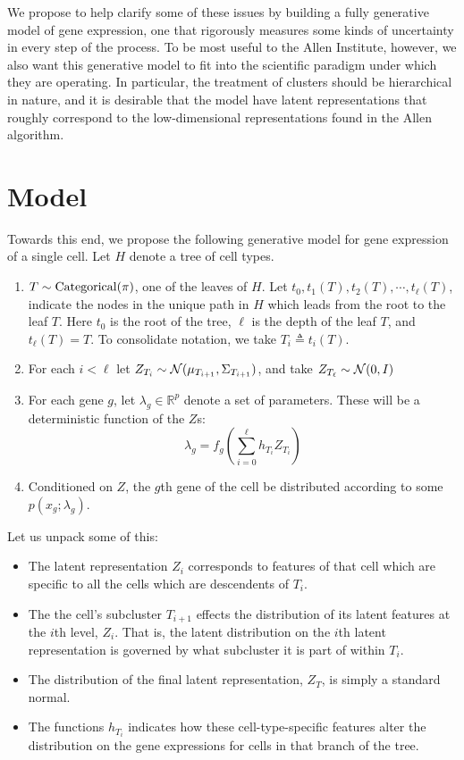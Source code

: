 We propose to help clarify some of these issues by building a fully generative model of gene expression, one that rigorously measures some kinds of uncertainty in every step of the process.  To be most useful to the Allen Institute, however, we also want this generative model to fit into the scientific paradigm under which they are operating.  In particular, the treatment of clusters should be hierarchical in nature, and it is desirable that the model have latent representations that roughly correspond to the low-dimensional representations found in the Allen algorithm.  

\section{Model}

Towards this end, we propose the following generative model for gene expression of a single cell.  Let $H$ denote a tree of cell types.   

\begin{enumerate}
\item $T \sim \operatorname*{Categorical}(\pi)$, one of the leaves of $H$.  Let $t_0,t_1(T),t_2(T),\cdots ,t_\ell(T)$, indicate the nodes in the unique path in $H$ which leads from the root to the leaf $T$.  Here $t_0$ is the root of the tree, $\ell$ is the depth of the leaf $T$, and $t_\ell(T)=T$.   To consolidate notation, we take $T_i \triangleq t_i(T)$.
\item For each $i<\ell$ let $Z_{T_i} \sim \mathcal{N}(\mu_{T_{i+1}},\Sigma_{T_{i+1}})$, and take $Z_{T_\ell} \sim \mathcal{N}(0,I)$
\item For each gene $g$, let $\lambda_g \in \mathbb R^{p}$ denote a set of parameters.  These will be a deterministic function of the $Z$s:
\[
\lambda_g = f_g \left(\sum_{i=0}^{\ell} h_{T_i}Z_{T_i}\right)
\]
\item Conditioned on $Z$, the  $g$th gene of the cell be distributed according to some $p(x_g ; \lambda_g)$. 
\end{enumerate}

Let us unpack some of this:

\begin{itemize}
\item The latent representation $Z_i$ corresponds to features of that cell which are specific to all the cells which are descendents of $T_i$.
\item The the cell's subcluster $T_{i+1}$ effects the distribution of its latent features at the $i$th level, $Z_i$.  That is, the latent distribution on the $i$th latent representation is governed by what subcluster it is part of within $T_i$.
\item The distribution of the final latent representation, $Z_T$, is simply a standard normal.
\item The functions $h_{T_i}$ indicates how these cell-type-specific features alter the distribution on the gene expressions for cells in that branch of the tree.  
\end{itemize}

